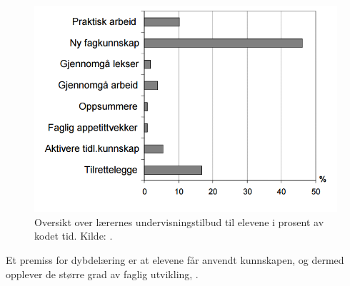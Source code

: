\documentclass[main.tex]{subfiles}
\begin{document}
\begin{figure}[h!]
\includegraphics[scale = 0.6]{../figures/undervisnings_aktivitet.png}
\caption{Oversikt over lærernes undervisningstilbud til elevene i prosent av kodet tid. Kilde: \protect{}.}
\label{fig:odeg10}
\end{figure}







Et premiss for dybdelæring er at elevene får anvendt kunnskapen, og dermed opplever de større grad av faglig utvikling, .
\end{document}
